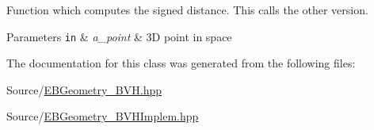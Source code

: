 Function which computes the signed distance. This calls the other version. 


\begin{DoxyParams}[1]{Parameters}
\mbox{\tt in}  & {\em a\+\_\+point} & 3D point in space \\
\hline
\end{DoxyParams}


The documentation for this class was generated from the following files\+:\begin{DoxyCompactItemize}
\item 
Source/\hyperlink{EBGeometry__BVH_8hpp}{E\+B\+Geometry\+\_\+\+B\+V\+H.\+hpp}\item 
Source/\hyperlink{EBGeometry__BVHImplem_8hpp}{E\+B\+Geometry\+\_\+\+B\+V\+H\+Implem.\+hpp}\end{DoxyCompactItemize}
